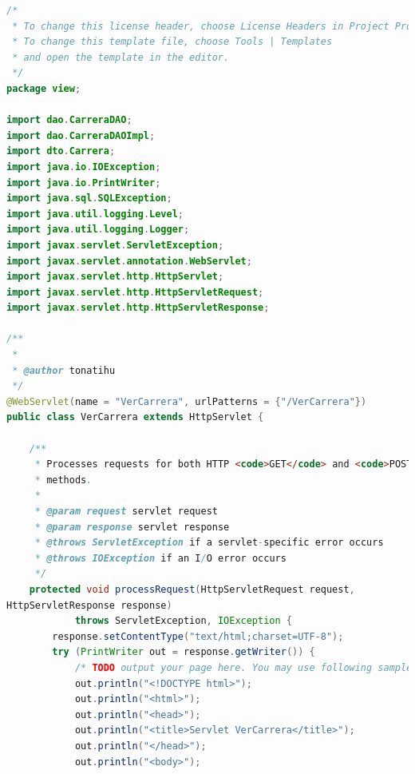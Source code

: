\documentclass[a4paper,12pt]{article}
\begin{document}
\begin{lstlisting}[language=Java, style=customJava, 
caption={VerCarrera.java},captionpos=b,basicstyle=\fontfamily{cmss}\small]
/*
 * To change this license header, choose License Headers in Project Properties.
 * To change this template file, choose Tools | Templates
 * and open the template in the editor.
 */
package view;

import dao.CarreraDAO;
import dao.CarreraDAOImpl;
import dto.Carrera;
import java.io.IOException;
import java.io.PrintWriter;
import java.sql.SQLException;
import java.util.logging.Level;
import java.util.logging.Logger;
import javax.servlet.ServletException;
import javax.servlet.annotation.WebServlet;
import javax.servlet.http.HttpServlet;
import javax.servlet.http.HttpServletRequest;
import javax.servlet.http.HttpServletResponse;

/**
 *
 * @author tonatihu
 */
@WebServlet(name = "VerCarrera", urlPatterns = {"/VerCarrera"})
public class VerCarrera extends HttpServlet {

    /**
     * Processes requests for both HTTP <code>GET</code> and <code>POST</code>
     * methods.
     *
     * @param request servlet request
     * @param response servlet response
     * @throws ServletException if a servlet-specific error occurs
     * @throws IOException if an I/O error occurs
     */
    protected void processRequest(HttpServletRequest request, 
HttpServletResponse response)
            throws ServletException, IOException {
        response.setContentType("text/html;charset=UTF-8");
        try (PrintWriter out = response.getWriter()) {
            /* TODO output your page here. You may use following sample code. */
            out.println("<!DOCTYPE html>");
            out.println("<html>");
            out.println("<head>");
            out.println("<title>Servlet VerCarrera</title>");
            out.println("</head>");
            out.println("<body>");


\end{lstlisting}
\end{document}
